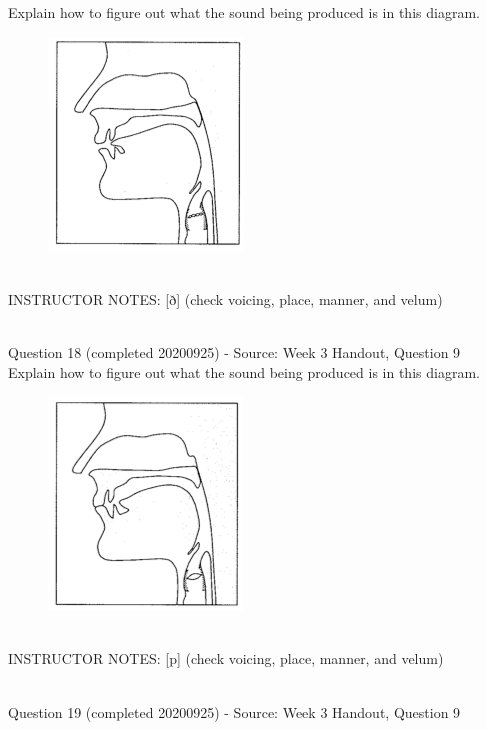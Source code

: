 \documentclass[12pt]{article}
\begin{document}
Explain how to figure out what the sound being produced is in this diagram.\\

\begin{figure}[H]
\includegraphics{../images/sagittal_eth.png}
\end{figure}

~\\
INSTRUCTOR NOTES: [ð] (check voicing, place, manner, and velum)


~\\

{\large Question 18} (completed 20200925) - Source: Week 3 Handout, Question 9\\

Explain how to figure out what the sound being produced is in this diagram.\\

\begin{figure}[H]
\includegraphics{../images/sagittal_p.png}
\end{figure}

~\\
INSTRUCTOR NOTES: [p] (check voicing, place, manner, and velum)


~\\

{\large Question 19} (completed 20200925) - Source: Week 3 Handout, Question 9\\
\end{document}
